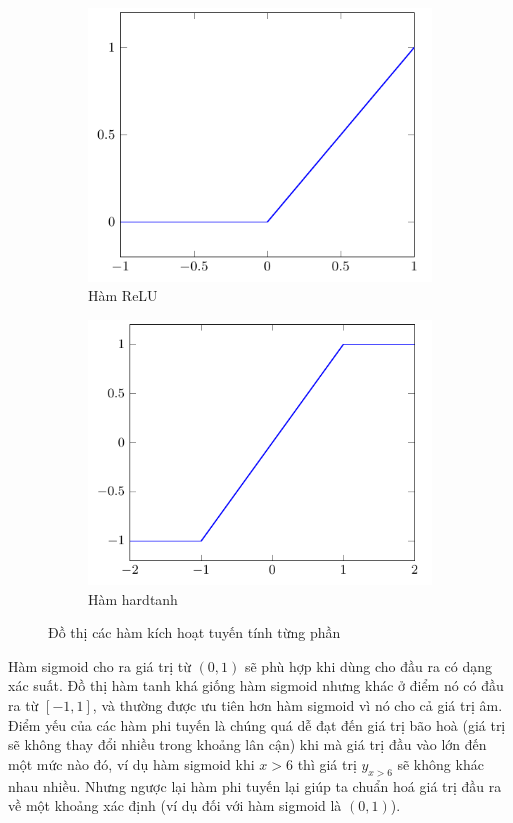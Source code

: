 \begin{figure}[htb]
    \centering
    \begin{subfigure}[htbp]{0.4\textwidth}
        \centering
        \includegraphics[width=\textwidth]{tikz_image/reLU.pdf}
        \caption{Hàm ReLU}
    \end{subfigure}%
    \begin{subfigure}[htbp]{0.4\textwidth}
        \centering
        \includegraphics[width=\textwidth]{tikz_image/hardtanh.pdf}
        \caption{Hàm hardtanh}
    \end{subfigure}%
    \caption{Đồ thị các hàm kích hoạt tuyến tính từng phần}
    \label{figure:activation-function-2}
\end{figure}
Hàm sigmoid cho ra giá trị từ $(0,1)$ sẽ phù hợp khi dùng cho đầu ra có dạng xác suất. Đồ thị hàm tanh khá giống hàm sigmoid nhưng khác ở điểm nó có đầu ra từ $[-1,1]$, và thường được ưu tiên hơn hàm sigmoid vì nó cho cả giá trị âm. Điểm yếu của các hàm phi tuyến là chúng quá dễ đạt đến giá trị bão hoà (giá trị sẽ không thay đổi nhiều trong khoảng lân cận) khi mà giá trị đầu vào lớn đến một mức nào đó, ví dụ hàm sigmoid khi $x>6$ thì giá trị $y_{x>6}$ sẽ không khác nhau nhiều. Nhưng ngược lại hàm phi tuyến lại giúp ta chuẩn hoá giá trị đầu ra về một khoảng xác định (ví dụ đối với hàm sigmoid là $(0,1)$).

